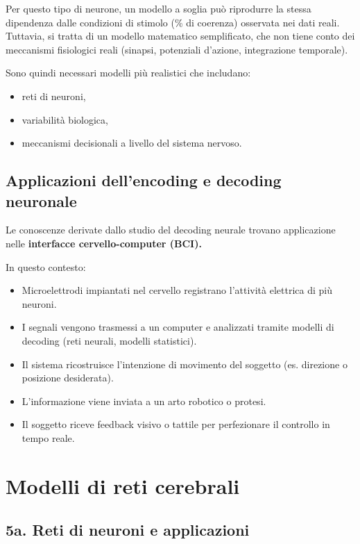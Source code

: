 \documentclass[12pt,a4paper,openany]{book}
\begin{document}
Per questo tipo di neurone, un modello a soglia può riprodurre la stessa dipendenza dalle condizioni di stimolo (\% di coerenza) osservata nei dati reali. Tuttavia, si tratta di un modello matematico semplificato, che non tiene conto dei meccanismi fisiologici reali (sinapsi, potenziali d'azione, integrazione temporale).

Sono quindi necessari modelli più realistici che includano:

\begin{itemize}
  \item reti di neuroni,
  \item variabilità biologica,
  \item meccanismi decisionali a livello del sistema nervoso.
\end{itemize}

\section{Applicazioni dell'encoding e decoding neuronale}

Le conoscenze derivate dallo studio del decoding neurale trovano applicazione nelle \textbf{interfacce cervello-computer (BCI).}

In questo contesto:

\begin{itemize}
  \item Microelettrodi impiantati nel cervello registrano l'attività elettrica di più neuroni.
  \item I segnali vengono trasmessi a un computer e analizzati tramite modelli di decoding (reti neurali, modelli statistici).
  \item Il sistema ricostruisce l'intenzione di movimento del soggetto (es. direzione o posizione desiderata).
  \item L'informazione viene inviata a un arto robotico o protesi.
  \item Il soggetto riceve feedback visivo o tattile per perfezionare il controllo in tempo reale.
\end{itemize}

\clearpage
\chapter{Modelli di reti cerebrali}


\section{5a. Reti di neuroni e applicazioni}
\end{document}
